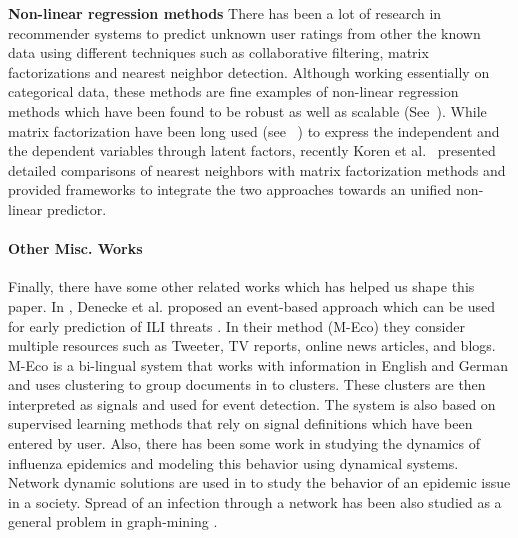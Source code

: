 \textbf{Non-linear regression methods}
There has been a lot of research in recommender systems to predict unknown user 
ratings from other the known data using different techniques such as collaborative 
filtering, matrix factorizations and nearest neighbor detection. Although
working essentially on categorical data, these methods are fine examples of non-linear
regression methods which have been found to be robust as well as scalable (See~\cite{koren2008factor}).
While matrix factorization have been long used (see ~\cite{canny2002factor}) to 
express the independent and the dependent variables through latent factors, 
recently Koren et al.~\cite{koren2008factor} presented detailed comparisons
of nearest neighbors with matrix factorization methods and provided frameworks to 
integrate the two approaches towards an unified non-linear predictor.

\paragraph{Other Misc. Works}
Finally, there have some other related works which has helped us shape this paper. 
In \cite{ref3}, Denecke et al.
proposed an event-based approach which can be used for early prediction
of ILI threats \cite{ref3}. In their method (M-Eco) they consider
multiple resources such as Tweeter, TV reports, online news articles,
and blogs. M-Eco is a bi-lingual system that works with information in
English and German and uses clustering to group documents in to
clusters. These clusters are then interpreted as signals and used for
event detection. The system is also based on supervised learning methods
that rely on signal definitions which have been entered by user.
Also, there has been some work in studying the dynamics of influenza epidemics and
modeling this behavior using dynamical systems. Network dynamic solutions are used in
\cite{ref11} to study the behavior of an epidemic issue in a society.
Spread of an infection through a network has been also studied as a
general problem in graph-mining \cite{ref13} \cite{ref14}. 
 
